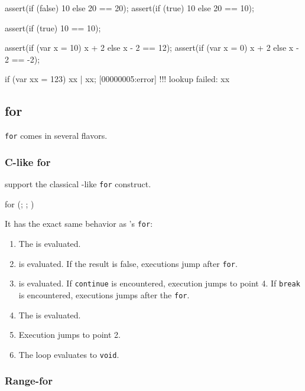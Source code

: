 \begin{urbiscript}
assert({if (false) 10 else 20} == 20);
assert({if (true)  10 else 20} == 10);

assert({if (true) 10         } == 10);

assert({if (var x = 10) x + 2 else x - 2} == 12);
assert({if (var x = 0)  x + 2 else x - 2} == -2);

if (var xx = 123) xx | xx;
[00000005:error] !!! lookup failed: xx
\end{urbiscript}

\subsection{for}
\label{sec:lang:for}
\lstinline|for| comes in several flavors.

\subsubsection{C-like for}

\us support the classical \C-like \lstinline|for| construct.

\begin{urbiunchecked}
for (; ; )
\end{urbiunchecked}

It has the exact same behavior as \C's \lstinline|for|:

\begin{enumerate}
\item The  is evaluated.
\item {} is evaluated. If the result is false, executions
  jump after \lstinline|for|.
\item {} is evaluated. If \lstinline|continue| is encountered,
  execution jumps to point 4. If \lstinline|break| is encountered,
  executions jumps after the \lstinline|for|.
\item The  is evaluated.
\item Execution jumps to point 2.
\item The loop evaluates to \lstinline|void|.
\end{enumerate}

\subsubsection{Range-for}
\label{sec:lang:for:each}

